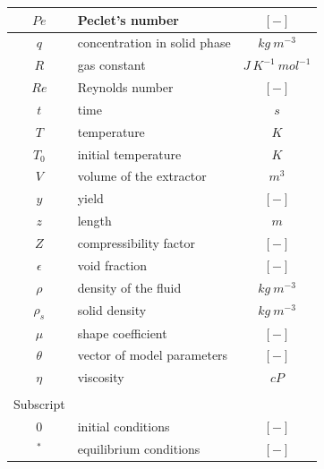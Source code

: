 \documentclass[a4paper,fleqn]{cas-dc}
\begin{document}
\begin{table}[p]
\begin{tabular}{ |c|l|c| }
			$Pe$		&	Peclet's number							& $[-]$						\\ \hline
			$q$			&	concentration in solid phase			& $kg ~ m^{-3}$				\\ \hline
			$R$			&	gas constant							& $J ~ K^{-1} ~ mol^{-1}$	\\ \hline
			$Re$		&	Reynolds number							& $[-]$						\\ \hline
			$t$			&	time									& $s$						\\ \hline
			$T$			&	temperature								& $K$						\\ \hline
			$T_0$		&	initial temperature						& $K$						\\ \hline
			$V$			&	volume of the extractor					& $m^3$						\\ \hline
			$y$			&	yield	 								& $[-]$						\\ \hline
			$z$			&	length									& $m$						\\ \hline
			$Z$			&	compressibility	factor					& $[-]$						\\ \hline
			$\epsilon$	&	void fraction							& $[-]$						\\ \hline
			$\rho$		&	density of the fluid					& $kg ~ m^{-3}$				\\ \hline
			$\rho_s$	&	solid density							& $kg ~ m^{-3}$				\\ \hline
			$\mu$		&	shape coefficient						& $[-]$						\\ \hline
			$\theta$	&	vector of model parameters				& $[-]$						\\ \hline
			$\eta$		&	viscosity								& $cP$						\\ \hline				
						& 											&							\\ \hline			
		 	Subscript	& 											&							\\ \hline
			$0$			&	initial conditions						& $[-]$						\\ \hline
			$^*$		&	equilibrium conditions					& $[-]$						\\ \hline							
		\end{tabular}
\end{table}
\fi
\end{document}
